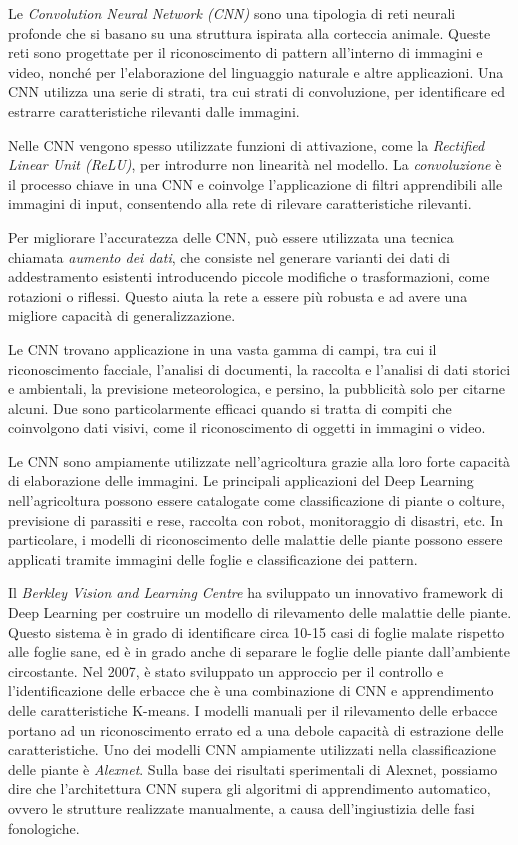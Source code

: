Le \textit{Convolution Neural Network (CNN)} sono una tipologia di reti neurali profonde che si basano su una struttura ispirata alla corteccia animale. Queste reti sono progettate per il riconoscimento di pattern all'interno di immagini e video, nonché per l'elaborazione del linguaggio naturale e altre applicazioni. Una CNN utilizza una serie di strati, tra cui strati di convoluzione, per identificare ed estrarre caratteristiche rilevanti dalle immagini.

Nelle CNN vengono spesso utilizzate funzioni di attivazione, come la \textit{Rectified Linear Unit (ReLU)}, per introdurre non linearità nel modello. La \textit{convoluzione} è il processo chiave in una CNN e coinvolge l'applicazione di filtri apprendibili alle immagini di input, consentendo alla rete di rilevare caratteristiche rilevanti.

Per migliorare l'accuratezza delle CNN, può essere utilizzata una tecnica chiamata \textit{aumento dei dati}, che consiste nel generare varianti dei dati di addestramento esistenti introducendo piccole modifiche o trasformazioni, come rotazioni o riflessi. Questo aiuta la rete a essere più robusta e ad avere una migliore capacità di generalizzazione.

Le CNN trovano applicazione in una vasta gamma di campi, tra cui il riconoscimento facciale, l'analisi di documenti, la raccolta e l'analisi di dati storici e ambientali, la previsione meteorologica, e persino, la pubblicità solo per citarne alcuni. Due sono particolarmente efficaci quando si tratta di compiti che coinvolgono dati visivi, come il riconoscimento di oggetti in immagini o video.

Le CNN sono ampiamente utilizzate nell'agricoltura grazie alla loro forte capacità di elaborazione delle immagini. Le principali applicazioni del Deep Learning nell'agricoltura possono essere catalogate come classificazione di piante o colture, previsione di parassiti e rese, raccolta con robot, monitoraggio di disastri, etc. In particolare, i modelli di riconoscimento delle malattie delle piante possono essere applicati tramite immagini delle foglie e classificazione dei pattern.

Il \textit{Berkley Vision and Learning Centre} ha sviluppato un innovativo framework di Deep Learning per costruire un modello di rilevamento delle malattie delle piante. Questo sistema è in grado di identificare circa 10-15 casi di foglie malate rispetto alle foglie sane, ed è in grado anche di separare le foglie delle piante dall'ambiente circostante. Nel 2007, è stato sviluppato un approccio per il controllo e l'identificazione delle erbacce che è una combinazione di CNN e apprendimento delle caratteristiche K-means. I modelli manuali per il rilevamento delle erbacce portano ad un riconoscimento errato ed a una debole capacità di estrazione delle caratteristiche. Uno dei modelli CNN ampiamente utilizzati nella classificazione delle piante è \textit{Alexnet}. Sulla base dei risultati sperimentali di Alexnet, possiamo dire che l'architettura CNN supera gli algoritmi di apprendimento automatico, ovvero le strutture realizzate manualmente, a causa dell'ingiustizia delle fasi fonologiche.

